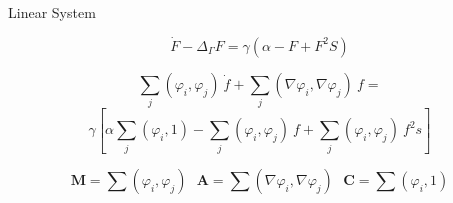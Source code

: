 \documentclass{beamer}
\begin{document}
            \begin{frame}{Linear System}
            
                
                {\Large $$\dot{F} - \Delta_\Gamma F= \gamma\left(\alpha - F + F^2S\right)$$}
                
                \vfill
                
                {\large $$\sum_j(\varphi_i, \varphi_j) ~\dot{f} + 
                \sum_j(\nabla\varphi_i, \nabla\varphi_j) ~f = $$
                $$\gamma\left[\alpha\sum_j(\varphi_i, 1) - 
                \sum_j(\varphi_i, \varphi_j) ~f + 
                \sum_j(\varphi_i, \varphi_j) ~f^2s\right]$$}
                
                \vfill 
                
                $$\textbf{M} = \sum(\varphi_i, \varphi_j) ~~~\textbf{A}=\sum(\nabla\varphi_i, \nabla\varphi_j) ~~~ \textbf{C}=\sum(\varphi_i, 1)$$
                
                \vfill
                
            \end{frame}
            
            
            
            
            
\end{document}
